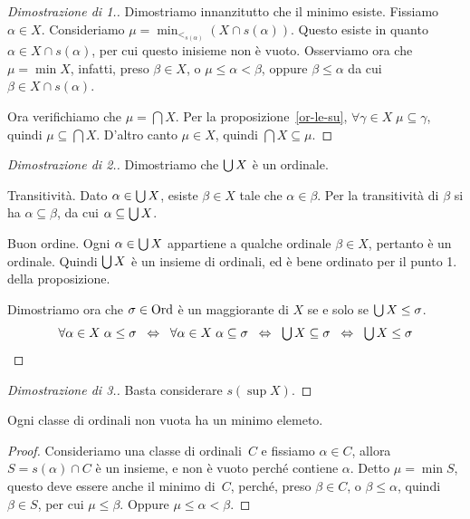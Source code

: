 \begin{proof}[Dimostrazione di 1.]
Dimostriamo innanzitutto che il minimo esiste.
Fissiamo $\alpha \in X$. Consideriamo $\mu = \min_{<_{s(\alpha)}}(X \cap s(\alpha))$.
		Questo esiste in quanto $\alpha \in X \cap s(\alpha)$, per
cui questo inisieme non \`e vuoto. 
Osserviamo ora che $\mu = \min X$, infatti, preso $\beta \in X$, o
$\mu\le\alpha<\beta$, oppure $\beta\le\alpha$ da cui $\beta\in X\cap
s(\alpha)$.

Ora verifichiamo che $\mu=\bigcap X$. Per la proposizione~\ref{or-le-su}, $\forall {\gamma
\in X} \; \mu \subseteq \gamma$, quindi $\mu \subseteq \bigcap X$.
		D'altro canto $\mu \in X$, quindi $\bigcap X \subseteq
\mu$.
\end{proof}

\begin{proof}[Dimostrazione di 2.]
\item Dimostriamo che ${\textstyle\bigcup}\, X$ \`e un ordinale.

{\drkblu Transitivit\`a.} Dato $\alpha \in {\textstyle\bigcup}\, X$, esiste $\beta \in
X$ tale che $\alpha \in \beta$. Per la transitivit\`a di $\beta$ si ha
$\alpha\subseteq \beta$, da cui $\alpha\subseteq {\textstyle\bigcup}\, X$.
	
{\drkblu Buon ordine.} Ogni $\alpha \in {\textstyle\bigcup}\, X$ appartiene a qualche
ordinale $\beta \in X$, pertanto \`e un ordinale. Quindi ${\textstyle\bigcup}\, X$ \`e
un insieme di ordinali, ed \`e bene ordinato per il punto 1. della proposizione.

Dimostriamo ora che $\sigma\in\operatorname{Ord}$ \`e un maggiorante di $X$ se e solo
se ${\textstyle\bigcup}\, X \le \sigma$.
\[ \forall {\alpha \in X}\; \alpha\le\sigma \;\;\Leftrightarrow\;\;
\forall {\alpha\in X}\; \alpha\subseteq\sigma \;\;\Leftrightarrow\;\;
{\textstyle\bigcup}\, X\subseteq \sigma \;\;\Leftrightarrow\;\; {\textstyle\bigcup}\, X \le \sigma \]
\end{proof}

\begin{proof}[Dimostrazione di 3.]
Basta considerare $s(\sup X)$.
\end{proof}

\begin{corollary}
Ogni classe di ordinali non vuota ha un minimo elemeto.
\end{corollary}

\begin{proof}
	Consideriamo una classe di ordinali~$C$ e fissiamo $\alpha\in C$, allora $S = s(\alpha)\cap C$ \`e un insieme,
e non \`e vuoto perch\'e contiene $\alpha$. Detto $\mu=\min S$, questo
deve essere anche il minimo di~$C$, perch\'e, preso $\beta\in C$, o
$\beta\le\alpha$, quindi $\beta\in S$, per cui $\mu\le\beta$. Oppure
$\mu\le\alpha<\beta$.
\end{proof}

